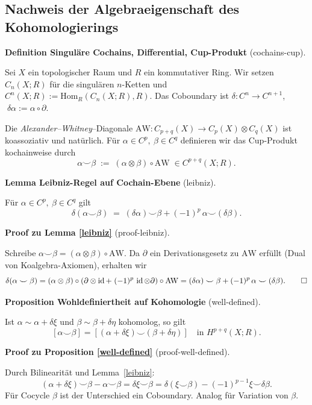 \documentclass[10pt, letterpaper]{article}
\newcommand{\id}{\operatorname{id}}
\newcommand{\Hom}{\mathrm{Hom}}
\newcommand{\CustomHeading}[3]{%
  \par\medskip\noindent%
  \textbf{#1 #2} \textnormal{(#3)}.\enskip%
}
\newenvironment{DEF}[2]{\begin{unitbox}\CustomHeading{Definition}{#1}{#2}}{\end{unitbox}}
\newenvironment{PROP}[2]{\begin{unitbox}\CustomHeading{Proposition}{#1}{#2}}{\end{unitbox}}
\newenvironment{LEM}[2]{\begin{unitbox}\CustomHeading{Lemma}{#1}{#2}}{\end{unitbox}}
\newenvironment{PROOF}[2]{\begin{unitbox}\CustomHeading{Proof}{#1}{#2}}{\end{unitbox}}
\begin{document}
\subsection{Nachweis der Algebraeigenschaft des Kohomologierings}

\begin{DEF}{Singuläre Cochains, Differential, Cup-Produkt}{cochains-cup}
Sei $X$ ein topologischer Raum und $R$ ein kommutativer Ring. 
Wir setzen $C_n(X;R)$ für die singulären $n$-Ketten und $C^n(X;R):=\Hom_R(C_n(X;R),R)$.
Das Coboundary ist $\delta:C^n\to C^{n+1}$, $\;\delta\alpha:=\alpha\circ\partial$.

Die \emph{Alexander–Whitney}–Diagonale $\mathrm{AW}:C_{p+q}(X)\to C_p(X)\otimes C_q(X)$ ist koassoziativ und natürlich. 
Für $\alpha\in C^p,\ \beta\in C^q$ definieren wir das Cup-Produkt kochainweise durch
\[
\alpha\smile\beta\;:=\;(\alpha\otimes\beta)\circ \mathrm{AW}\;\in C^{p+q}(X;R).
\]
\end{DEF}

\begin{LEM}{Leibniz-Regel auf Cochain-Ebene}{leibniz}
Für $\alpha\in C^p,\ \beta\in C^q$ gilt
\[
\delta(\alpha\smile\beta)\;=\;(\delta\alpha)\smile\beta + (-1)^p\,\alpha\smile(\delta\beta).
\]
\end{LEM}

\begin{PROOF}{zu Lemma \ref{leibniz}}{proof-leibniz}
Schreibe $\alpha\smile\beta=(\alpha\otimes\beta)\circ \mathrm{AW}$. 
Da $\partial$ ein Derivationsgesetz zu $\mathrm{AW}$ erfüllt (Dual von Koalgebra-Axiomen), erhalten wir
\[
\delta(\alpha\smile\beta)
=(\alpha\otimes\beta)\circ (\partial\otimes\id+\;(-1)^p\,\id\otimes\partial)\circ\mathrm{AW}
=(\delta\alpha)\smile\beta + (-1)^p\,\alpha\smile(\delta\beta).
\qedhere
\]
\end{PROOF}

\begin{PROP}{Wohldefiniertheit auf Kohomologie}{well-defined}
Ist $\alpha\sim \alpha+\delta\xi$ und $\beta\sim \beta+\delta\eta$ kohomolog, so gilt
\[
[\alpha\smile\beta]=[(\alpha+\delta\xi)\smile(\beta+\delta\eta)]\quad\text{in }H^{p+q}(X;R).
\]
\end{PROP}

\begin{PROOF}{zu Proposition \ref{well-defined}}{proof-well-defined}
Durch Bilinearität und Lemma~\ref{leibniz}:
\[
(\alpha+\delta\xi)\smile\beta-\alpha\smile\beta
=\delta\xi\smile\beta
=\delta(\xi\smile\beta)-(-1)^{p-1}\xi\smile\delta\beta.
\]
Für Cocycle $\beta$ ist der Unterschied ein Coboundary. Analog für Variation von $\beta$.
\end{PROOF}
\end{document}
